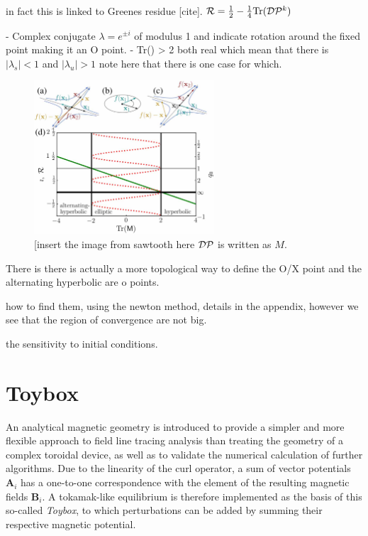 in fact this is linked to Greenes residue [cite].
$\mathcal{R} = \frac{1}{2} - \frac{1}{4}\text{Tr}(\mathcal{D}\mathcal{P}^k)$

- Complex conjugate $\lambda = e^{\pm i}$ of modulus 1 and indicate rotation around the fixed point making it an O point.
- Tr() > 2 both real which mean that there is $\vert\lambda_s\vert < 1$ and $\vert\lambda_u\vert > 1$ note here that there is one case for which.

\begin{figure}[H]
    \centering
    \includegraphics[width=0.6\textwidth]{images/theory/smeit_sawtooth.jpg}
    \caption{[insert the image from sawtooth here $\mathcal{D}\mathcal{P}$ is written as $M$.}
    \label{fig:enter-label}
\end{figure}

There is there is actually a more topological way to define the O/X point and the alternating hyperbolic are o points.

how to find them, using the newton method, details in the appendix, however we see that the region of convergence are not big.

\begin{figure}[H]
    \hfill
    \caption{}
\end{figure}

the sensitivity to initial conditions.

\chapter{Toybox}
An analytical magnetic geometry is introduced to provide a simpler and more flexible approach to field line tracing analysis than treating the geometry of a complex toroidal device, as well as to validate the numerical calculation of further algorithms. Due to the linearity of the curl operator, a sum of vector potentials $\textbf{A}_i$ has a one-to-one correspondence with the element of the resulting magnetic fields $\textbf{B}_i$. A tokamak-like equilibrium is therefore implemented as the basis of this so-called \textit{Toybox}, to which perturbations can be added by summing their respective magnetic potential.

